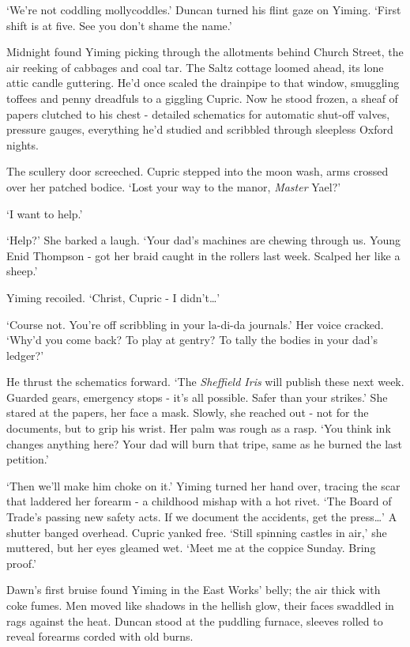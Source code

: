 `We're not coddling mollycoddles.' Duncan turned his flint gaze on Yiming. `First shift is at five. See you don't shame the name.'

Midnight found Yiming picking through the allotments behind Church Street, the air reeking of cabbages and coal tar. The Saltz cottage loomed ahead, its lone attic candle guttering. He'd once scaled the drainpipe to that window, smuggling toffees and penny dreadfuls to a giggling Cupric. Now he stood frozen, a sheaf of papers clutched to his chest - detailed schematics for automatic shut-off valves, pressure gauges, everything he'd studied and scribbled through sleepless Oxford nights.

The scullery door screeched. Cupric stepped into the moon wash, arms crossed over her patched bodice. `Lost your way to the manor, \textit{Master} Yael?'

`I want to help.'

`Help?' She barked a laugh. `Your dad's machines are chewing through us. Young Enid Thompson - got her braid caught in the rollers last week. Scalped her like a sheep.'

Yiming recoiled. `Christ, Cupric - I didn't\dots'

`Course not. You're off scribbling in your la-di-da journals.' Her voice cracked. `Why'd you come back? To play at gentry? To tally the bodies in your dad's ledger?'

He thrust the schematics forward. `The \textit{Sheffield Iris} will publish these next week. Guarded gears, emergency stops - it's all possible. Safer than your strikes.'
She stared at the papers, her face a mask. Slowly, she reached out - not for the documents, but to grip his wrist. Her palm was rough as a rasp. `You think ink changes anything here? Your dad will burn that tripe, same as he burned the last petition.'

`Then we'll make him choke on it.' Yiming turned her hand over, tracing the scar that laddered her forearm - a childhood mishap with a hot rivet. `The Board of Trade's passing new safety acts. If we document the accidents, get the press\dots'
A shutter banged overhead. Cupric yanked free. `Still spinning castles in air,' she muttered, but her eyes gleamed wet. `Meet me at the coppice Sunday. Bring proof.'

Dawn's first bruise found Yiming in the East Works' belly; the air thick with coke fumes. Men moved like shadows in the hellish glow, their faces swaddled in rags against the heat. Duncan stood at the puddling furnace, sleeves rolled to reveal forearms corded with old burns.

